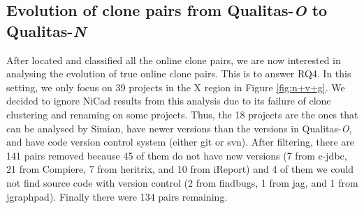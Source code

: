 \documentclass{IEEEtran}
\begin{document}
\subsection{Evolution of clone pairs from Qualitas-\textit{O} to Qualitas-\textit{N}}
After located and classified all the online clone pairs, we are now interested in analysing the evolution of true online clone pairs. This is to answer RQ4. In this setting, we only focus on 39 projects in the X region in Figure \ref{fig:n+v+g}. We decided to ignore NiCad results from this analysis due to its failure of clone clustering and renaming on some projects.  Thus, the 18 projects are the ones that can be analysed by Simian, have newer versions than the versions in Qualitas-\textit{O}, and have code version control system (either git or svn). After filtering, there are 141 pairs removed because 45 of them do not have new versions (7 from c-jdbc, 21 from Compiere, 7 from heritrix, and 10 from iReport) and 4 of them we could not find source code with version control (2 from findbugs, 1 from jag, and 1 from jgraphpad). Finally there were 134  pairs remaining. %
\end{document}
